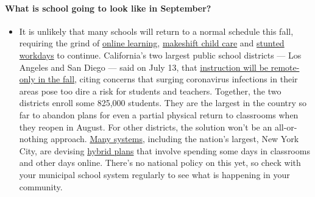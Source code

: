 \begin{itemize}
{  \paragraph{What is school going to look like in
  September?}\label{what-is-school-going-to-look-like-in-september}}

  \begin{itemize}
  \tightlist
  \item
    It is unlikely that many schools will return to a normal schedule
    this fall, requiring the grind of
    \href{https://www.nytimes.com/2020/06/05/us/coronavirus-education-lost-learning.html?action=click\&pgtype=Article\&state=default\&region=MAIN_CONTENT_3\&context=storylines_faq}{online
    learning},
    \href{https://www.nytimes.com/2020/05/29/us/coronavirus-child-care-centers.html?action=click\&pgtype=Article\&state=default\&region=MAIN_CONTENT_3\&context=storylines_faq}{makeshift
    child care} and
    \href{https://www.nytimes.com/2020/06/03/business/economy/coronavirus-working-women.html?action=click\&pgtype=Article\&state=default\&region=MAIN_CONTENT_3\&context=storylines_faq}{stunted
    workdays} to continue. California's two largest public school
    districts --- Los Angeles and San Diego --- said on July 13, that
    \href{https://www.nytimes.com/2020/07/13/us/lausd-san-diego-school-reopening.html?action=click\&pgtype=Article\&state=default\&region=MAIN_CONTENT_3\&context=storylines_faq}{instruction
    will be remote-only in the fall}, citing concerns that surging
    coronavirus infections in their areas pose too dire a risk for
    students and teachers. Together, the two districts enroll some
    825,000 students. They are the largest in the country so far to
    abandon plans for even a partial physical return to classrooms when
    they reopen in August. For other districts, the solution won't be an
    all-or-nothing approach.
    \href{https://bioethics.jhu.edu/research-and-outreach/projects/eschool-initiative/school-policy-tracker/}{Many
    systems}, including the nation's largest, New York City, are
    devising
    \href{https://www.nytimes.com/2020/06/26/us/coronavirus-schools-reopen-fall.html?action=click\&pgtype=Article\&state=default\&region=MAIN_CONTENT_3\&context=storylines_faq}{hybrid
    plans} that involve spending some days in classrooms and other days
    online. There's no national policy on this yet, so check with your
    municipal school system regularly to see what is happening in your
    community.
  \end{itemize}
\end{itemize}


